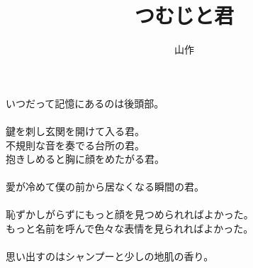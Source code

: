 \documentclass[a5j,12pt]{tbook}
\title{つむじと君}
\author{\rensuji{J}山\rensuji{B}作}
\date{}
\begin{document}
\maketitle

いつだって記憶にあるのは後頭部。\\
\\
鍵を刺し玄関を開けて入る君。\\
不規則な音を奏でる台所の君。\\
抱きしめると胸に顔をめたがる君。\\
\\
愛が冷めて僕の前から居なくなる瞬間の君。\\
\\
恥ずかしがらずにもっと顔を見つめられればよかった。\\
もっと名前を呼んで色々な表情を見られればよかった。\\
\\
思い出すのはシャンプーと少しの地肌の香り。
\end{document}
